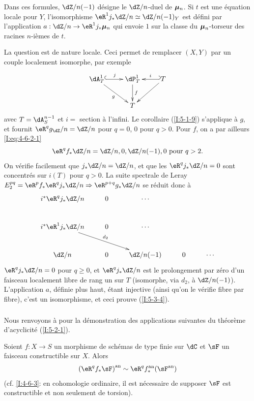 Dans ces formules, $\dZ/n(-1)$ désigne le $\dZ/n$-duel de ${\bm\mu}_n$. Si $t$ 
est une équation locale pour $Y$, l'isomorphisme 
$\eR^1j_*\dZ/n\simeq\dZ/n(-1)_Y$ est défini par l'application 
$a:\dZ/n\to \eR^1j_*\dmu_n$ qui envoie $1$ sur la classe du ${\bm\mu}_n$-torseur des 
racines $n$-ièmes de $t$. 

La question est de nature locale. Ceci permet de remplacer $(X,Y)$ par un 
couple localement isomorphe, par exemple 
\[\xymatrix{
  \dA_T^1 \ar@{^{(}->}[r]^-j \ar[dr]_-g 
    & \dP_T^1 \ar[d]^-f 
    & \ar@{_{(}->}[l]_-i T \ar[dl] \\
  & T
}\]
avec $T=\dA_S^{n-1}$ et $i=$ section à l'infini. Le corollaire (\ref{I:5-1-9}) 
s'applique à $g$, et fournit $\eR^q g_ \dZ/n=\dZ/n$ pour $q=0$, $0$ pour $q>0$. 
Pour $f$, on a par ailleurs \eqref{I:eq:4-6-2-1}
\[
  \eR^q f_* \dZ/n = \dZ/n,0,\dZ/n(-1),0 \text{ pour $q>2$.}
\]
On vérifie facilement que $j_* \dZ/n = \dZ/n$, et que les $\eR^q j_*\dZ/n = 0$ 
sont concentrés sur $i(T)$ pour $q>0$. La suite spectrale de Leray 
$E_2^{pq} = \eR^p f_* \eR^q j_*\dZ/n \Rightarrow \eR^{p+q}g_* \dZ/n$ se réduit 
donc à 
\[\xymatrix{
  i^* \eR^q j_* \dZ/n & 0 & \cdots \\
  i^* \eR^1 j_* \dZ/n \ar[drr]^-{d_2} & 0 & \cdots \\
  \dZ/n              & 0 & \dZ/n(-1) & 0 & \cdots
}\]
$\eR^q j_*\dZ/n=0$ pour $q\geqslant 0$, et $\eR^q j_*\dZ/n$ est le prolongement 
par zéro d'un faisceau localement libre de rang un sur $T$ (isomorphe, via 
$d_2$, à $\dZ/n(-1)$). L'application $a$, définie plus haut, étant 
injective (ainsi qu'on le vérifie fibre par fibre), c'est un isomorphisme, et 
ceci prouve (\ref{I:5-3-4}). 





\subsubsection{}\label{I:5-3-5}

Nous renvoyons à \cite[XVI.4,5]{sga4} pour la démonstration des 
applications suivantes du théorème d'acyclicité (\ref{I:5-2-1}). 





\begin{theorem}\label{I:5-3-6} %
Soient $f:X\to S$ un morphisme de schémas de type finie sur $\dC$ et $\sF$ un 
faisceau constructible sur $X$. Alors 
\[
  \an{(\eR^q f_*\sF)} \sim \eR^q \an f_* (\an\sF)
\]
(cf. \ref{I:4-6-3}: en cohomologie ordinaire, il est nécessaire de supposer 
$\sF$ est constructible et non seulement de torsion). 
\end{theorem}





